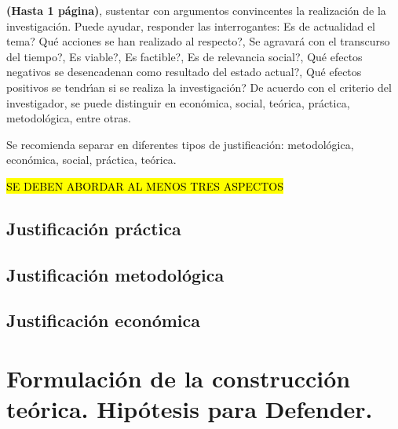 \textbf{(Hasta 1 p\'{a}gina)}, sustentar con argumentos convincentes la realizaci\'{o}n de la investigaci\'{o}n.
Puede ayudar, responder las interrogantes: \textquestiondown{}Es de actualidad el tema? \textquestiondown{}Qu\'{e}
acciones se han realizado al respecto?, \textquestiondown{}Se agravar\'{a} con el transcurso del tiempo?,
\textquestiondown{}Es viable?, \textquestiondown{}Es factible?, \textquestiondown{}Es de relevancia social?,
\textquestiondown{}Qu\'{e} efectos negativos se desencadenan como resultado del estado actual?,
\textquestiondown{}Qu\'{e} efectos positivos se tendr\'{\i}an si se realiza la investigaci\'{o}n?
De acuerdo con el criterio del investigador, se puede distinguir en econ\'{o}mica, social, te\'{o}rica, pr\'{a}ctica,
metodol\'{o}gica, entre otras. 


Se recomienda separar en diferentes tipos de justificaci\'{o}n: metodol\'{o}gica, econ\'{o}mica, 
social, pr\'{a}ctica, te\'{o}rica. 


\hl{SE DEBEN ABORDAR AL MENOS TRES ASPECTOS} 


\subsection{Justificaci\'{o}n pr\'{a}ctica}
\label{cap0:sub:justificacion_practica}


\subsection{Justificaci\'{o}n metodol\'{o}gica}
\label{cap0:sub:justificacion_metodologica}


\subsection{Justificaci\'{o}n econ\'{o}mica}
\label{cap0:sub:justificacion_economica}


\section{Formulaci\'on de la construcci\'on te\'orica. Hip\'otesis para Defender.}
\label{cap0:sec:formulacion_de_la_construccion_teorica}

